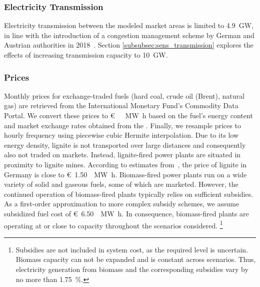 \documentclass[review, 3p, times, 12pt, authoryear]{elsarticle}
\begin{document}
    \subsubsection{Electricity Transmission}
    Electricity transmission between the modeled market areas is limited to \SI{4.9}{\giga\watt}, in line with the introduction of a congestion management scheme by German and Austrian authorities in 2018~\citep{BNetzA2017}.
    Section \ref{subsubsec:sens_transmission} explores the effects of increasing transmission capacity to \SI{10}{\giga\watt}.

    \subsubsection{Prices}
    Monthly prices for exchange-traded fuels (hard coal, crude oil (Brent), natural gas) are retrieved from the International Monetary Fund's Commodity Data Portal.
    We convert these prices to \SI[per-mode=symbol,sticky-per, bracket-unit-denominator=false]{}[\euro]{\per\mega\watt\hour} based on the fuel's energy content and market exchange rates obtained from the \cite{ECB2020}.
    Finally, we resample prices to hourly frequency using piecewise cubic Hermite interpolation.
    Due to its low energy density, lignite is not transported over large distances and consequently also not traded on markets.
    Instead, lignite-fired power plants are situated in proximity to lignite mines.
    According to estimates from~\cite{OekoInstitut2017}, the price of lignite in Germany is close to \SI[per-mode=symbol,sticky-per, bracket-unit-denominator=false]{1.50}[\euro]{\per\mega\watt\hour}.
    Biomass-fired power plants run on a wide variety of solid and gaseous fuels, some of which are marketed.
    However, the continued operation of biomass-fired plants typically relies on sufficient subsidies.
    As a first-order approximation to more complex subsidy schemes, we assume subsidized fuel cost of \SI[per-mode=symbol,sticky-per, bracket-unit-denominator=false]{6.50}[\euro]{\per\mega\watt\hour}.
    In consequence, biomass-fired plants are operating at or close to capacity throughout the scenarios considered.
    \footnote{Subsidies are not included in system cost, as the required level is uncertain. Biomass capacity can not be expanded and is constant across scenarios. Thus, electricity generation from biomass and the corresponding subsidies vary by no more than \SI{1.75}{\percent}.}
\end{document}
